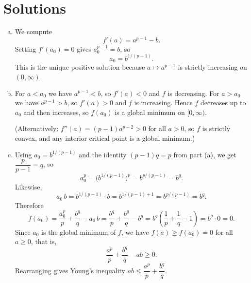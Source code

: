 \documentclass[12pt]{article}
\begin{document}
\newpage
\section*{Solutions}

\begin{enumerate}[(a)]

\item We compute
      \[
        f'(a) = a^{p-1}-b.
      \]
      Setting $f'(a_0)=0$ gives $a_0^{p-1}=b$, so
      \[
        a_0 = b^{1/(p-1)}.
      \]
      This is the unique positive solution because $a\mapsto a^{p-1}$ is
      strictly increasing on $(0,\infty)$.

\item For $a < a_0$ we have $a^{p-1} < b$, so $f'(a)<0$ and $f$ is decreasing.
      For $a > a_0$ we have $a^{p-1}>b$, so $f'(a)>0$ and $f$ is increasing.
      Hence $f$ decreases up to $a_0$ and then increases, so $f(a_0)$ is a global minimum on $[0,\infty)$.

      (Alternatively: $f''(a)=(p-1)a^{p-2}>0$ for all $a>0$,
      so $f$ is strictly convex, and any interior critical point is a global minimum.)

\item Using $a_0 = b^{1/(p-1)}$ and the identity $(p-1)q=p$ from part (a),
      we get $\dfrac{p}{p-1}=q$, so
      \[
        a_0^p = \bigl(b^{1/(p-1)}\bigr)^p = b^{p/(p-1)} = b^q.
      \]
      Likewise,
      \[
        a_0\,b = b^{1/(p-1)}\cdot b = b^{1/(p-1)+1} = b^{p/(p-1)} = b^q.
      \]
      Therefore
      \[
        f(a_0)
        = \frac{a_0^p}{p}+\frac{b^q}{q}-a_0\,b
        = \frac{b^q}{p}+\frac{b^q}{q}-b^q
        = b^q\!\left(\frac{1}{p}+\frac{1}{q}-1\right)
        = b^q\cdot 0
        = 0.
      \]
      Since $a_0$ is the global minimum of $f$, we have $f(a)\geq f(a_0)=0$ for all $a\geq 0$,
      that is,
      \[
        \frac{a^p}{p}+\frac{b^q}{q}-ab\geq 0.
      \]
      Rearranging gives Young's inequality $ab\leq\dfrac{a^p}{p}+\dfrac{b^q}{q}$.

\end{enumerate}
\end{document}
